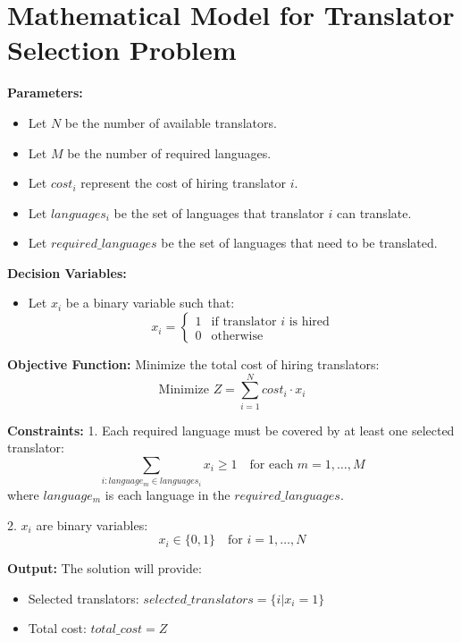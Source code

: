 \documentclass{article}
\begin{document}
\section*{Mathematical Model for Translator Selection Problem}

\textbf{Parameters:}
\begin{itemize}
    \item Let \( N \) be the number of available translators.
    \item Let \( M \) be the number of required languages.
    \item Let \( cost_i \) represent the cost of hiring translator \( i \).
    \item Let \( languages_i \) be the set of languages that translator \( i \) can translate.
    \item Let \( required\_languages \) be the set of languages that need to be translated.
\end{itemize}

\textbf{Decision Variables:}
\begin{itemize}
    \item Let \( x_i \) be a binary variable such that:
    \[
    x_i = 
    \begin{cases} 
    1 & \text{if translator } i \text{ is hired} \\
    0 & \text{otherwise}
    \end{cases}
    \]
\end{itemize}

\textbf{Objective Function:}
Minimize the total cost of hiring translators:
\[
\text{Minimize } Z = \sum_{i=1}^N cost_i \cdot x_i
\]

\textbf{Constraints:}
1. Each required language must be covered by at least one selected translator:
\[
\sum_{i: language_m \in languages_i} x_i \geq 1 \quad \text{for each } m = 1, \ldots, M
\]
where \( language_m \) is each language in the \( required\_languages \).

2. \( x_i \) are binary variables:
\[
x_i \in \{0, 1\} \quad \text{for } i = 1, \ldots, N
\]

\textbf{Output:}
The solution will provide:
\begin{itemize}
    \item Selected translators: \( selected\_translators = \{ i | x_i = 1 \} \)
    \item Total cost: \( total\_cost = Z \)
\end{itemize}
\end{document}
